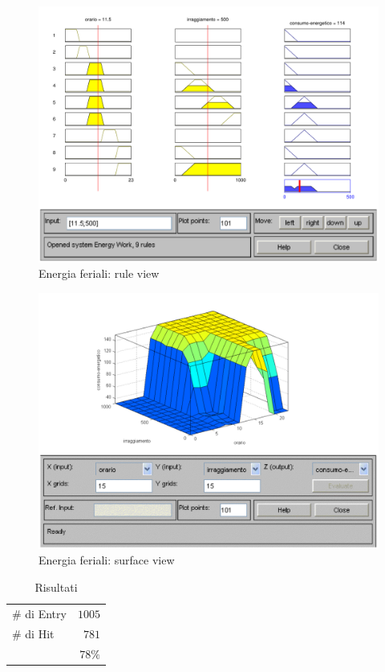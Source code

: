 \begin{figure}[htbp]
  \centering
  \includegraphics[scale=0.5]{images/fuzzy/energia_feriali_rule_view.pdf}
  \caption{Energia feriali: rule view}
\end{figure}

\begin{figure}[htbp]
  \centering
  \includegraphics[scale=0.5]{images/fuzzy/energia_feriali_surface_view.pdf}
  \caption{Energia feriali: surface view}
\end{figure}

\begin{table}
  \caption{Risultati}
  \centering
	\begin{tabular}{lr}
		\toprule
      \# di Entry & $ 1005 $ \\
			\# di Hit   & $ 781 $ \\
		\midrule
			& $ 78\% $ \\
		\bottomrule
	\end{tabular}
\end{table}



